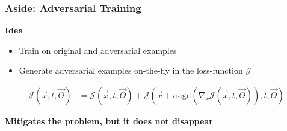 \begin{frame}
\frametitle{Aside: Adversarial Training}
\begin{center}
	\textbf{Idea}
	\begin{itemize}
	\item Train on original and adversarial examples
	\item Generate adversarial examples on-the-fly in the loss-function $\mathcal{J}$
	\end{itemize}
	
	\begin{align*}
	\tilde{\mathcal{J}}(\vec{x}, t, \vec{\Theta}) &= \mathcal{J}(\vec{x}, t, \vec{\Theta}) + \mathcal{J}(\vec{x} + \epsilon \mathrm{sign}(\nabla_x \mathcal{J}(\vec{x}, t, \vec{\Theta})), t, \vec{\Theta})
	\end{align*}
	
	\textbf{Mitigates the problem, but it does not disappear}
\end{center}
      
\end{frame}

